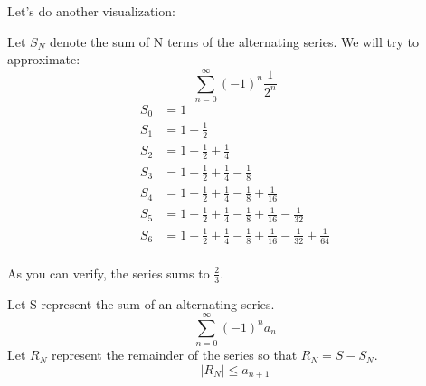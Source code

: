 	Let's do another visualization:\\
    \begin{simple}{}{}
        Let $S_N$ denote the sum of N terms of the alternating series. We will try to approximate:
        $$\sum^\infty_{n=0}(-1)^n\frac{1}{2^n}$$
        \begin{align*}
            S_0&=1\\
            S_1&=1-\frac{1}{2}\\
            S_2&=1-\frac{1}{2}+\frac{1}{4}\\
            S_3&=1-\frac{1}{2}+\frac{1}{4}-\frac{1}{8}\\
            S_4&=1-\frac{1}{2}+\frac{1}{4}-\frac{1}{8}+\frac{1}{16}\\
            S_5&=1-\frac{1}{2}+\frac{1}{4}-\frac{1}{8}+\frac{1}{16}-\frac{1}{32}\\
            S_6&=1-\frac{1}{2}+\frac{1}{4}-\frac{1}{8}+\frac{1}{16}-\frac{1}{32}+\frac{1}{64}\\
        \end{align*}
        \begin{center}
        \end{center}
        
        As you can verify, the series sums to $\frac{2}{3}$.
    \end{simple}
	
	\begin{theorem}{}{}
	    \indent Let S represent the sum of an alternating series.
	    $$\sum^\infty_{n=0}(-1)^na_n$$
	    Let $R_N$ represent the remainder of the series so that $R_N=S-S_N$. 
        \begin{equation}
            \left|R_N\right|\leq a_{n+1}
        \end{equation}
	\end{theorem}
	
